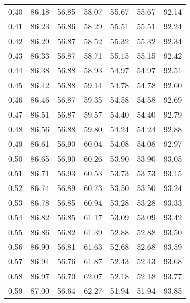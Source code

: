 \begin{tabular}{|c|c|c|c|c|c|c|}
      0.40 &     86.18 &     56.85 &      58.07 &   55.67 &      55.67 &         92.14 \\
      0.41 &     86.23 &     56.86 &      58.29 &   55.51 &      55.51 &         92.24 \\
      0.42 &     86.29 &     56.87 &      58.52 &   55.32 &      55.32 &         92.34 \\
      0.43 &     86.33 &     56.87 &      58.71 &   55.15 &      55.15 &         92.42 \\
      0.44 &     86.38 &     56.88 &      58.93 &   54.97 &      54.97 &         92.51 \\
      0.45 &     86.42 &     56.88 &      59.14 &   54.78 &      54.78 &         92.60 \\
      0.46 &     86.46 &     56.87 &      59.35 &   54.58 &      54.58 &         92.69 \\
      0.47 &     86.51 &     56.87 &      59.57 &   54.40 &      54.40 &         92.79 \\
      0.48 &     86.56 &     56.88 &      59.80 &   54.24 &      54.24 &         92.88 \\
      0.49 &     86.61 &     56.90 &      60.04 &   54.08 &      54.08 &         92.97 \\
      0.50 &     86.65 &     56.90 &      60.26 &   53.90 &      53.90 &         93.05 \\
      0.51 &     86.71 &     56.93 &      60.53 &   53.73 &      53.73 &         93.15 \\
      0.52 &     86.74 &     56.89 &      60.73 &   53.50 &      53.50 &         93.24 \\
      0.53 &     86.78 &     56.85 &      60.94 &   53.28 &      53.28 &         93.33 \\
      0.54 &     86.82 &     56.85 &      61.17 &   53.09 &      53.09 &         93.42 \\
      0.55 &     86.86 &     56.82 &      61.39 &   52.88 &      52.88 &         93.50 \\
      0.56 &     86.90 &     56.81 &      61.63 &   52.68 &      52.68 &         93.59 \\
      0.57 &     86.94 &     56.76 &      61.87 &   52.43 &      52.43 &         93.68 \\
      0.58 &     86.97 &     56.70 &      62.07 &   52.18 &      52.18 &         93.77 \\
      0.59 &     87.00 &     56.64 &      62.27 &   51.94 &      51.94 &         93.85 \\

\end{tabular}
